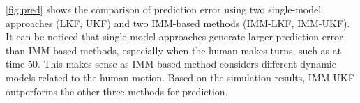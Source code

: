 \documentclass[letterpaper, 10 pt, conference]{ieeeconf}
\begin{document}
\cref{fig:pred} shows the comparison of prediction error using two single-model approaches (LKF, UKF) and two IMM-based methods (IMM-LKF, IMM-UKF).
It can be noticed that single-model approaches generate larger prediction error than IMM-based methods, especially when the human makes turns,  such as at time $50$.
This makes sense as IMM-based method considers different dynamic models related to the human motion.
Based on the simulation results, IMM-UKF outperforms the other three methods for prediction.
\end{document}

